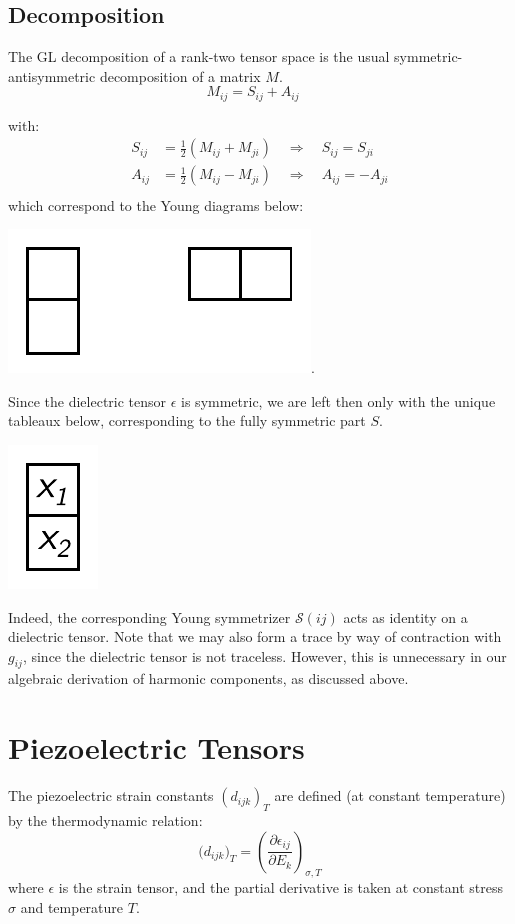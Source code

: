 \documentclass[10pt,a4paper]{article}
\begin{document}
\subsection{Decomposition}
The GL decomposition of a rank-two tensor space is the usual symmetric-antisymmetric decomposition of a matrix $M$.
$$
M_{ij} = S_{ij} + A_{ij}\quad
$$
\begin{center}
with:
\begin{align*}
S_{ij}&=\frac{1}{2}(M_{ij}+M_{ji})\quad \Rightarrow\quad S_{ij}=S_{ji}\\
A_{ij}&=\frac{1}{2}(M_{ij}-M_{ji})\quad \Rightarrow\quad A_{ij}=-A_{ji}\\
\end{align*}
which correspond to the Young diagrams below:

\includegraphics[scale=0.7]{rank2_young.pdf}.
\end{center}
Since the dielectric tensor $\epsilon$ is symmetric, we are left then only with the unique tableaux below, corresponding to the fully symmetric part $S$.
\begin{center}

\includegraphics[scale=0.7]{dielectric_young.pdf}

\end{center}
Indeed, the corresponding Young symmetrizer $\mathcal{S}(ij)$ acts as identity on a dielectric tensor. Note that we may also form a trace by way of contraction with $g_{ij}$, since the dielectric tensor is not traceless. However, this is unnecessary in our algebraic derivation of harmonic components, as discussed above.

\section{Piezoelectric Tensors}
The piezoelectric strain constants $(d_{ijk})_{T}$ are defined (at constant temperature) by the thermodynamic relation:
$$
\big(d_{ijk}\big)_{T}=\left(\frac{\partial \epsilon_{ij}}{\partial E_k} \right)_{\sigma, T}
$$
where $\epsilon$ is the strain tensor, and the partial derivative is taken at constant stress $\sigma$ and temperature $T$.
\end{document}
